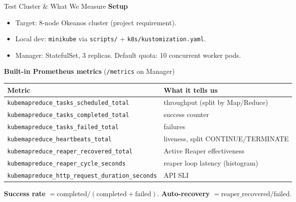 \documentclass[11pt]{beamer}
\begin{document}
\begin{frame}{Test Cluster \& What We Measure}
\textbf{Setup}
\begin{itemize}\small
  \item Target: \alert{8-node Okeanos cluster} (project requirement).
  \item Local dev: \texttt{minikube} via \texttt{scripts/} +
        \texttt{k8s/kustomization.yaml}.
  \item Manager: StatefulSet, 3 replicas. Default quota: 10 concurrent worker pods.
\end{itemize}

\vspace{0.3em}
\textbf{Built-in Prometheus metrics} (\texttt{/metrics} on Manager)
\begin{table}
\centering
\scriptsize
\begin{tabular}{ll}
\toprule
Metric                                            & What it tells us \\
\midrule
\texttt{kubemapreduce\_tasks\_scheduled\_total}   & throughput (split by Map/Reduce) \\
\texttt{kubemapreduce\_tasks\_completed\_total}   & success counter \\
\texttt{kubemapreduce\_tasks\_failed\_total}      & failures \\
\texttt{kubemapreduce\_heartbeats\_total}         & liveness, split CONTINUE/TERMINATE \\
\texttt{kubemapreduce\_reaper\_recovered\_total}  & \alert{Active Reaper effectiveness} \\
\texttt{kubemapreduce\_reaper\_cycle\_seconds}    & reaper loop latency (histogram) \\
\texttt{kubemapreduce\_http\_request\_duration\_seconds} & API SLI \\
\bottomrule
\end{tabular}
\end{table}

\scriptsize
\textbf{Success rate} $= \mathrm{completed} / (\mathrm{completed} + \mathrm{failed})$.\quad
\textbf{Auto-recovery} $= \mathrm{reaper\_recovered} / \mathrm{failed}$.
\end{frame}
\end{document}
